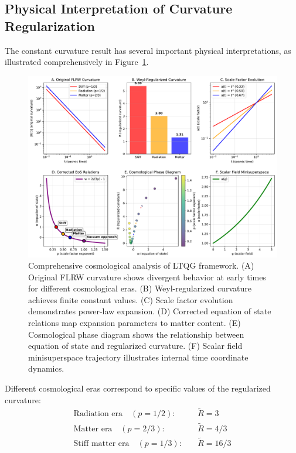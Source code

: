 \subsection{Physical Interpretation of Curvature Regularization}
\label{subsec:physical_interpretation}

The constant curvature result has several important physical interpretations, as illustrated comprehensively in Figure~\ref{fig:cosmology_comprehensive}.

\begin{figure}[htbp]
\centering
\includegraphics[width=\textwidth]{ltqg_cosmology_comprehensive.pdf}
\caption{Comprehensive cosmological analysis of LTQG framework. (A) Original FLRW curvature shows divergent behavior at early times for different cosmological eras. (B) Weyl-regularized curvature achieves finite constant values. (C) Scale factor evolution demonstrates power-law expansion. (D) Corrected equation of state relations map expansion parameters to matter content. (E) Cosmological phase diagram shows the relationship between equation of state and regularized curvature. (F) Scalar field minisuperspace trajectory illustrates internal time coordinate dynamics.}
\label{fig:cosmology_comprehensive}
\end{figure}

\begin{theorem}
\label{thm:cosmological_eras}
Different cosmological eras correspond to specific values of the regularized curvature:
\begin{align}
\text{Radiation era} \quad (p = 1/2): \quad &\tilde{R} = 3 \\
\text{Matter era} \quad (p = 2/3): \quad &\tilde{R} = 4/3 \\
\text{Stiff matter era} \quad (p = 1/3): \quad &\tilde{R} = 16/3
\end{align}
\end{theorem}

